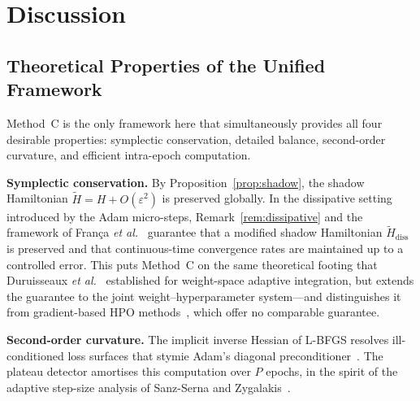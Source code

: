 \documentclass[11pt]{article}
\theoremstyle{definition}
\newcommand{\tHH}{\widetilde{H}}
\begin{document}




\section{Discussion}

\subsection{Theoretical Properties of the Unified Framework}

Method~C is the only framework here that simultaneously provides all
four desirable properties: symplectic conservation, detailed
balance, second-order curvature, and efficient intra-epoch
computation.

\textbf{Symplectic conservation.} By
Proposition~\ref{prop:shadow}, the shadow Hamiltonian
$\tHH=H+O(\varepsilon^2)$ is preserved globally. In the dissipative
setting introduced by the Adam micro-steps,
Remark~\ref{rem:dissipative} and the framework of Fran\c{c}a \emph{et
al.}~\cite{franca2021dissipative} guarantee that a modified shadow
Hamiltonian $\tHH_{\mathrm{diss}}$ is preserved and that
continuous-time convergence rates are maintained up to a controlled
error. This puts Method~C on the same theoretical footing that
Duruisseaux \emph{et al.}~\cite{duruisseaux2021adaptive} established
for weight-space adaptive integration, but extends the guarantee to
the joint weight--hyperparameter system---and distinguishes it from
gradient-based HPO
methods~\cite{lorraine2020millions,franceschi2018bilevel}, which
offer no comparable guarantee.

\textbf{Second-order curvature.} The implicit inverse Hessian of
L-BFGS resolves ill-conditioned loss surfaces that stymie Adam's
diagonal preconditioner~\cite{liu1989lbfgs}. The plateau detector
amortises this computation over $P$ epochs, in the spirit of the
adaptive step-size analysis of Sanz-Serna and
Zygalakis~\cite{sanzserna2021lyapunov}.
\end{document}
